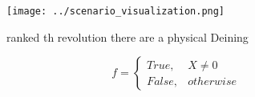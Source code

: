 \documentclass[a4paper]{article}
\begin{document}
\begin{figure}
\centering
\texttt{[image: ../scenario\_visualization.png]}
\caption{ranked th revolution there are a physical Deining
}
\end{figure}
 
\begin{equation}   f =
\begin{cases} True, & X \neq 0\\
False, & otherwise
\end{cases}
\end{equation}
\end{document}
